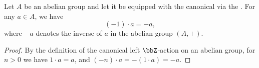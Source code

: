 \begin{lemma}\label{lemma:minus_one_times_element_is_inverse_in_Z_module}
Let $A$ be an abelian group and let it be equipped with the canonical  via the . For any $a \in A$, we have
$$ (-1) \cdot a = -a, $$
where $-a$ denotes the inverse of $a$ in the abelian group $(A,+)$.
\end{lemma}

\begin{proof}
    By the definition of the canonical left $\bbZ$-action on an abelian group, for $n > 0$ we have $1 \cdot a = a$, and $(-n) \cdot a = -(1 \cdot a) = -a$.
\end{proof}